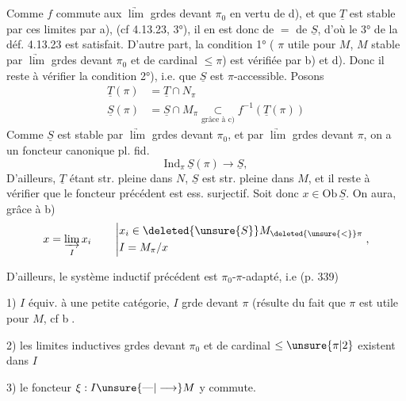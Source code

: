 Comme $f$ commute aux $\underrightarrow{\lim}$ grdes devant $\pi_0$ en vertu de d), et que $\underline T$ est stable par ces limites par a), (cf 4.13.23, 3°), il en est donc de $=$ de $\underline S$, d'où le 3° de la déf. 4.13.23 est satisfait. D'autre part,  la condition 1° (  $\pi$ utile pour $M$, $M$ stable par $\underrightarrow{\lim}$ grdes devant $\pi_0$ et de cardinal $\leq\pi$) est vérifiée par b) et d). Donc il reste à vérifier la condition 2°), i.e. que $\underline S$ est $\pi$-accessible.    Posons
\[
\begin{aligned}
\underline T(\pi)&=\underline T\cap N_\pi\\
\underline S(\pi)&=\underline S\cap M_\pi\underset{\text{grâce à c)}}{\subset}f^{-1}(\underline T(\pi))
\end{aligned}
\]
 Comme $\underline S$ est stable  par $\underrightarrow{\lim}$ grdes devant $\pi_0$,  et  par $\underrightarrow{\lim}$ grdes devant $\pi$,  on a un foncteur canonique pl. fid.
\[
\mathrm{Ind}_{\pi}\,\underline S(\pi)\longrightarrow\underline S,
\]
D'ailleurs, $\underline T$ étant str. pleine dans $N$, $\underline S$ est str. pleine dans $M$, et il reste à vérifier que le foncteur précédent est ess. surjectif. Soit donc $x\in\mathrm{Ob}\,\underline S$. On aura, grâce à b)
\[
x=\underset{I}{\underrightarrow{\lim}}\,x_i
\qquad\left|\begin{aligned}
 &x_i\in\deleted{\unsure{S}}M_{\deleted{\unsure{<}}\pi}\\
 &I=M_\pi/x
\end{aligned}\right. ,
\]

D'ailleurs, le système inductif précédent est $\pi_0$-$\pi$-adapté, i.e (p. 339)

1) $I$ équiv. à une petite catégorie, $I$ grde devant $\pi$ (résulte du fait que $\pi$ est utile pour $M$, cf \textcircled{b}.

2) les limites inductives grdes devant $\pi_0$ et de cardinal $\leq\unsure{\pi|2}$ existent dans $I$ 

3) le foncteur $\xi:I\unsure{\text{---}|\longrightarrow}M$ y commute.

